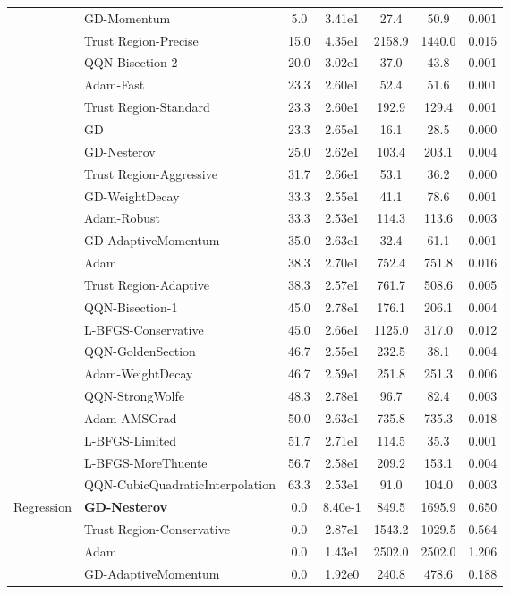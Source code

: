 \documentclass{article}
\begin{document}
\begin{table}[htbp]
{\begin{tabular}{p{2.5cm}p{2.5cm}*{5}{c}}
 & GD-Momentum & 5.0 & 3.41e1 & 27.4 & 50.9 & 0.001 \\
 & Trust Region-Precise & 15.0 & 4.35e1 & 2158.9 & 1440.0 & 0.015 \\
 & QQN-Bisection-2 & 20.0 & 3.02e1 & 37.0 & 43.8 & 0.001 \\
 & Adam-Fast & 23.3 & 2.60e1 & 52.4 & 51.6 & 0.001 \\
 & Trust Region-Standard & 23.3 & 2.60e1 & 192.9 & 129.4 & 0.001 \\
 & GD & 23.3 & 2.65e1 & 16.1 & 28.5 & 0.000 \\
 & GD-Nesterov & 25.0 & 2.62e1 & 103.4 & 203.1 & 0.004 \\
 & Trust Region-Aggressive & 31.7 & 2.66e1 & 53.1 & 36.2 & 0.000 \\
 & GD-WeightDecay & 33.3 & 2.55e1 & 41.1 & 78.6 & 0.001 \\
 & Adam-Robust & 33.3 & 2.53e1 & 114.3 & 113.6 & 0.003 \\
 & GD-AdaptiveMomentum & 35.0 & 2.63e1 & 32.4 & 61.1 & 0.001 \\
 & Adam & 38.3 & 2.70e1 & 752.4 & 751.8 & 0.016 \\
 & Trust Region-Adaptive & 38.3 & 2.57e1 & 761.7 & 508.6 & 0.005 \\
 & QQN-Bisection-1 & 45.0 & 2.78e1 & 176.1 & 206.1 & 0.004 \\
 & L-BFGS-Conservative & 45.0 & 2.66e1 & 1125.0 & 317.0 & 0.012 \\
 & QQN-GoldenSection & 46.7 & 2.55e1 & 232.5 & 38.1 & 0.004 \\
 & Adam-WeightDecay & 46.7 & 2.59e1 & 251.8 & 251.3 & 0.006 \\
 & QQN-StrongWolfe & 48.3 & 2.78e1 & 96.7 & 82.4 & 0.003 \\
 & Adam-AMSGrad & 50.0 & 2.63e1 & 735.8 & 735.3 & 0.018 \\
 & L-BFGS-Limited & 51.7 & 2.71e1 & 114.5 & 35.3 & 0.001 \\
 & L-BFGS-MoreThuente & 56.7 & 2.58e1 & 209.2 & 153.1 & 0.004 \\
 & QQN-CubicQuadraticInterpolation & 63.3 & 2.53e1 & 91.0 & 104.0 & 0.003 \\
\midrule
\multirow{25}{*}{Regression} & \textbf{GD-Nesterov} & 0.0 & 8.40e-1 & 849.5 & 1695.9 & 0.650 \\
 & Trust Region-Conservative & 0.0 & 2.87e1 & 1543.2 & 1029.5 & 0.564 \\
 & Adam & 0.0 & 1.43e1 & 2502.0 & 2502.0 & 1.206 \\
 & GD-AdaptiveMomentum & 0.0 & 1.92e0 & 240.8 & 478.6 & 0.188 \\

\end{tabular}}
\end{table}
\end{document}
